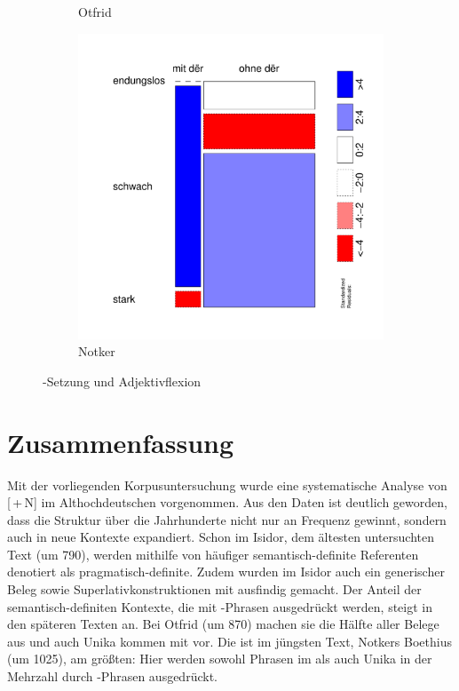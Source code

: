 \begin{figure}
\begin{subfigure}[b]{.5\linewidth}
\caption {Otfrid}
\end{subfigure}
\begin{subfigure}[b]{.5\linewidth}
  \includegraphics[height=.25\textheight]{generated/images/adjektive-N}
\caption {Notker}
\end{subfigure}
\caption{-Setzung und Adjektivflexion}
\label{fig:ther-adj}
\end{figure}

\section{Zusammenfassung}

Mit der vorliegenden Korpusuntersuchung wurde eine systematische Analyse von [\,+\,N] im Althochdeutschen vorgenommen. Aus den Daten ist deutlich geworden, dass die Struktur über die Jahrhunderte nicht nur an Frequenz gewinnt, sondern auch in neue Kontexte expandiert. Schon im Isidor, dem ältesten untersuchten Text (um 790), werden mithilfe von  häufiger semantisch-definite  Referenten denotiert als  pragmatisch-definite. Zudem wurden im Isidor auch ein generischer   Beleg sowie Superlativkonstruktionen  mit  ausfindig gemacht. Der Anteil der semantisch-definiten  Kontexte, die mit -Phrasen  ausgedrückt werden, steigt in den späteren Texten an. Bei Otfrid (um 870) machen sie die Hälfte aller Belege aus und auch Unika  kommen mit  vor. Die  ist im jüngsten Text, Notkers Boethius (um 1025), am größten: Hier werden sowohl Phrasen im  als auch Unika  in der Mehrzahl durch -Phrasen  ausgedrückt.

